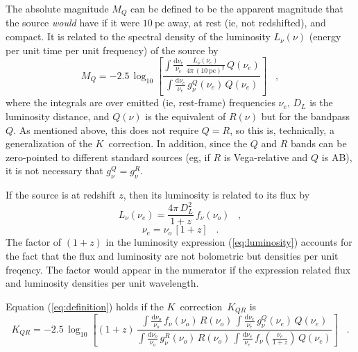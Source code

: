 \documentclass[preprint]{aastex}
\newcommand{\kcorrection}{$K$~correction}
\newcommand{\nuobs}{\nu_o}
\newcommand{\nuemit}{\nu_e}
\begin{document}
The absolute magnitude $M_Q$ can be defined to be the apparent
magnitude that the source \emph{would} have if it were
$10~\mathrm{pc}$ away, at rest (ie, not redshifted), and compact.  It
is related to the spectral density of the luminosity $L_{\nu}(\nu)$
(energy per unit time per unit frequency) of the source by
\begin{equation}
M_Q = -2.5\,\log_{10}\left[
  \frac{\displaystyle
          \int\frac{\mathrm{d}\nuemit}{\nuemit}\,
              \frac{L_{\nu}(\nuemit)}{4\pi\,(10~\mathrm{pc})^2}\,Q(\nuemit)}
       {\displaystyle
          \int\frac{\mathrm{d}\nuemit}{\nuemit}\,g^Q_{\nu}(\nuemit)\,Q(\nuemit)}
\right] \;\;\;,
\end{equation}
where the integrals are over emitted (ie, rest-frame) frequencies
$\nuemit$, $D_L$ is the luminosity distance, and $Q(\nu)$ is the
equivalent of $R(\nu)$ but for the bandpass $Q$.  As mentioned above,
this does not require $Q=R$, so this is, technically, a generalization
of the \kcorrection.  In addition, since the $Q$ and $R$ bands can be
zero-pointed to different standard sources (eg, if $R$ is
Vega-relative and $Q$ is AB), it is not necessary that
$g^Q_{\nu}=g^R_{\nu}$.

If the source is at redshift $z$, then its luminosity is related to
its flux by
\begin{equation}
\label{eq:luminosity}
L_{\nu}(\nuemit) = \frac{4\pi\,D_L^2}{1+z}\,f_{\nu}(\nuobs) \;\;\;,
\end{equation}
\begin{equation}
\nuemit = \nuobs\,[1+z] \;\;\;.
\end{equation}
The factor of $(1+z)$ in the luminosity expression
(\ref{eq:luminosity}) accounts for the fact that the flux and
luminosity are not bolometric but densities per unit freqency.  The
factor would appear in the numerator if the expression related flux
and luminosity densities per unit wavelength.

Equation (\ref{eq:definition}) holds if the \kcorrection\ $K_{QR}$ is
\begin{equation}
\label{eq:kcorrection}
K_{QR} = -2.5\,\log_{10}\left[(1+z)\,
  \frac{\displaystyle
          \int\frac{\mathrm{d}\nuobs}{\nuobs}\,f_{\nu}(\nuobs)\,R(\nuobs)\,
          \int\frac{\mathrm{d}\nuemit}{\nuemit}\,g^Q_{\nu}(\nuemit)\,Q(\nuemit)}
       {\displaystyle
          \int\frac{\mathrm{d}\nuobs}{\nuobs}\,g^R_{\nu}(\nuobs)\,R(\nuobs)\,
          \int\frac{\mathrm{d}\nuemit}{\nuemit}\,
            f_{\nu}\left(\frac{\nuemit}{1+z}\right)\,Q(\nuemit)}
\right] \;\;\;.
\end{equation}
\end{document}
